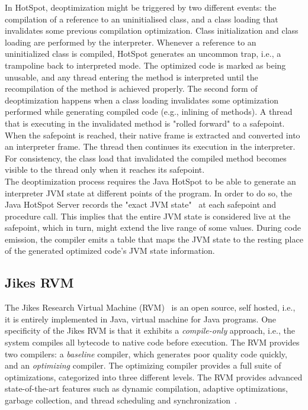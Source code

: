 In HotSpot, deoptimization might be triggered by two different events: the compilation of a reference to an uninitialised class, and a class loading that invalidates some previous compilation optimization.
Class initialization and class loading are performed by the interpreter. 
Whenever a reference to an uninitialized class is compiled, HotSpot generates an uncommon trap, i.e., a trampoline back to interpreted mode. 
The optimized code is  marked as being unusable, and any thread entering the method is interpreted until the recompilation of the method is achieved properly. 
The second form of deoptimization happens when a class loading invalidates some optimization performed while generating compiled code (e.g., inlining of methods).
A thread that is executing in the invalidated method is "rolled forward"\cite{paleczny2001java} to a safepoint.
When the safepoint is reached, their native frame is extracted and converted into an interpreter frame.
The thread then continues its execution in the interpreter. 
For consistency, the class load that invalidated the compiled method becomes visible to the thread only when it reaches its safepoint.\\

The deoptimization process requires the Java HotSpot to be able to generate an interpreter JVM state at different points of the program.
In order to do so, the Java HotSpot Server records the "exact JVM state"~\cite{paleczny2001java} at each safepoint and procedure call.
This implies that the entire JVM state is considered live at the safepoint, which in turn, might extend the live range of some values.
During code emission, the compiler emits a table that maps the JVM state to the resting place of the generated optimized code's JVM state information.\\

\subsection{Jikes RVM}

The Jikes Research Virtual Machine (RVM)~\cite{JikesRVMURL} is an open source, self hosted, i.e., it is entirely implemented in Java, virtual machine for Java programs.
One specificity of the Jikes RVM is that it exhibits a \textit{compile-only} approach, i.e., the system compiles all bytecode to native code before execution.
The RVM provides two compilers: a \textit{baseline} compiler, which generates poor quality code quickly, and an \textit{optimizing} compiler. 
The optimizing compiler provides a full suite of optimizations, categorized into three different levels.
The RVM provides advanced state-of-the-art features such as dynamic compilation, adaptive optimizations, garbage collection, and thread scheduling and synchronization~\cite{JikesRVMURL}.\\

